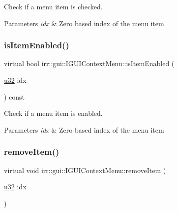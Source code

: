 Check if a menu item is checked. 


\begin{DoxyParams}{Parameters}
{\em idx} & Zero based index of the menu item \\
\hline
\end{DoxyParams}
\mbox{\label{classirr_1_1gui_1_1IGUIContextMenu_a0064345c63e1f8e124e64ca96eb486e2}} 
\subsubsection{\texorpdfstring{is\+Item\+Enabled()}{isItemEnabled()}}
{\footnotesize\ttfamily virtual bool irr\+::gui\+::\+I\+G\+U\+I\+Context\+Menu\+::is\+Item\+Enabled (\begin{DoxyParamCaption}\item[{\hyperlink{namespaceirr_a0416a53257075833e7002efd0a18e804}{u32}}]{idx }\end{DoxyParamCaption}) const\hspace{0.3cm}{\ttfamily [pure virtual]}}



Check if a menu item is enabled. 


\begin{DoxyParams}{Parameters}
{\em idx} & Zero based index of the menu item \\
\hline
\end{DoxyParams}
\mbox{\label{classirr_1_1gui_1_1IGUIContextMenu_af8cc0fc0f430044a318d4597f8535e9b}} 
\subsubsection{\texorpdfstring{remove\+Item()}{removeItem()}}
{\footnotesize\ttfamily virtual void irr\+::gui\+::\+I\+G\+U\+I\+Context\+Menu\+::remove\+Item (\begin{DoxyParamCaption}\item[{\hyperlink{namespaceirr_a0416a53257075833e7002efd0a18e804}{u32}}]{idx }\end{DoxyParamCaption})\hspace{0.3cm}{\ttfamily [pure virtual]}}



